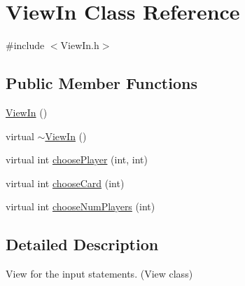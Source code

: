 \hypertarget{class_view_in}{\section{View\-In Class Reference}
\label{class_view_in}
}


{\ttfamily \#include $<$View\-In.\-h$>$}

\subsection*{Public Member Functions}
\begin{DoxyCompactItemize}
\item 
\hyperlink{class_view_in_ad24777c474d271b2758106d9ed4b3515}{View\-In} ()
\item 
virtual \hyperlink{class_view_in_a5c50b11c7c5a7e43f8d49057b77c1961}{$\sim$\-View\-In} ()
\item 
virtual int \hyperlink{class_view_in_a9b8ec8154354503af00665960d0b7d20}{choose\-Player} (int, int)
\item 
virtual int \hyperlink{class_view_in_ad93dc72d6ac780efa910d0fc0901437c}{choose\-Card} (int)
\item 
virtual int \hyperlink{class_view_in_af3110ca42bc8b38cfea8f8943befd492}{choose\-Num\-Players} (int)
\end{DoxyCompactItemize}


\subsection{Detailed Description}
View for the input statements. (View class) 

